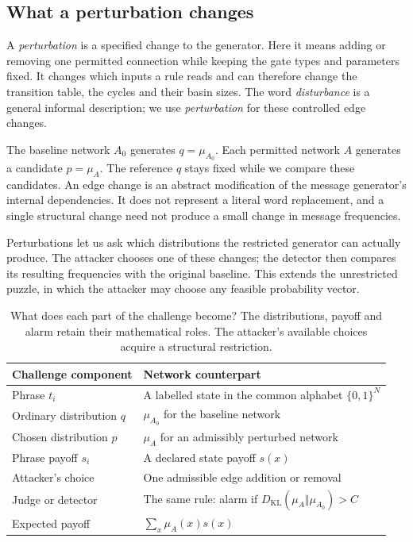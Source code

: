 \documentclass[11pt,a4paper]{article}
\newcommand{\KL}{D_{\mathrm{KL}}}
\newcommand{\bits}{\{0,1\}}
\begin{document}
\subsection{What a perturbation changes}
A \emph{perturbation} is a specified change to the generator. Here it
means adding or removing one permitted connection while keeping the gate
types and parameters fixed. It changes which inputs a rule reads and can
therefore change the transition table, the cycles and their basin sizes.
The word \emph{disturbance} is a general informal description; we use
\emph{perturbation} for these controlled edge changes.

The baseline network $A_0$ generates $q=\mu_{A_0}$. Each permitted network
$A$ generates a candidate $p=\mu_A$. The reference $q$ stays fixed while
we compare these candidates. An edge change is an abstract modification
of the message generator's internal dependencies. It does not represent
a literal word replacement, and a single structural change need not
produce a small change in message frequencies.

Perturbations let us ask which distributions the restricted generator
can actually produce. The attacker chooses one of these changes; the
detector then compares its resulting frequencies with the original
baseline. This extends the unrestricted puzzle, in which the attacker
may choose any feasible probability vector.

\begin{table}[htbp]\centering\small
\begin{tabularx}{\linewidth}{lX}
\toprule
Challenge component & Network counterpart\\\midrule
Phrase $t_i$ & A labelled state in the common alphabet $\bits^N$\\
Ordinary distribution $q$ & $\mu_{A_0}$ for the baseline network\\
Chosen distribution $p$ & $\mu_A$ for an admissibly perturbed network\\
Phrase payoff $s_i$ & A declared state payoff $s(x)$\\
Attacker's choice & One admissible edge addition or removal\\
Judge or detector & The same rule: alarm if $\KL(\mu_A\Vert\mu_{A_0})>C$\\
Expected payoff & $\sum_x\mu_A(x)s(x)$\\
\bottomrule
\end{tabularx}
\caption{What does each part of the challenge become? The distributions,
payoff and alarm retain their mathematical roles. The attacker's available
choices acquire a structural restriction.}
\label{tab:mapping}
\end{table}
\end{document}
